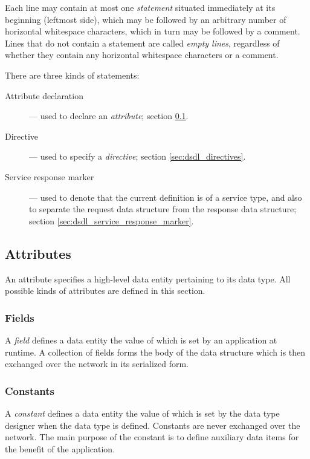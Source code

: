 Each line may contain at most one \emph{statement} situated immediately at its beginning (leftmost side),
which may be followed by an arbitrary number of horizontal whitespace characters,
which in turn may be followed by a comment.
Lines that do not contain a statement are called \emph{empty lines},
regardless of whether they contain any horizontal whitespace characters or a comment.

There are three kinds of statements:

\begin{description}
    \item[Attribute declaration] --- used to declare an \emph{attribute}; section \ref{sec:dsdl_attributes}.

    \item[Directive] --- used to specify a \emph{directive}; section \ref{sec:dsdl_directives}.

    \item[Service response marker] --- used to denote that the current definition is of a service type,
    and also to separate the request data structure from the response data structure;
    section \ref{sec:dsdl_service_response_marker}.
\end{description}

\subsection{Attributes}\label{sec:dsdl_attributes}

An attribute specifies a high-level data entity pertaining to its data type.
All possible kinds of attributes are defined in this section.

\subsubsection{Fields}

A \emph{field} defines a data entity the value of which is set by an application at runtime.
A collection of fields forms the body of the data structure which is then exchanged over the network in its
serialized form.

\subsubsection{Constants}

A \emph{constant} defines a data entity the value of which is set by the data type designer
when the data type is defined.
Constants are never exchanged over the network.
The main purpose of the constant is to define auxiliary data items for the benefit of the application.

